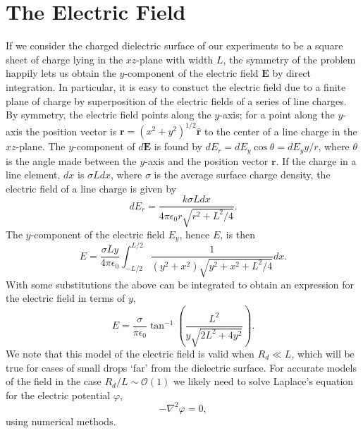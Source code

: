 \documentclass[12pt,a4paper,oneside]{book}
\begin{document}
\section{The Electric Field}
If we consider the charged dielectric surface of our experiments to be a square sheet of charge lying in the $xz$-plane with width $L$, the symmetry of the problem happily lets us obtain the $y$-component of the electric field $\mathbf{E}$ by direct integration. In particular, it is easy to constuct the electric field due to a finite plane of charge by superposition of the electric fields of a series of line charges. By symmetry, the electric field points along the $y$-axis; for a point along the $y$-axis the position vector is $\mathbf{r} = \left( x^2 + y^2 \right)^{1/2} \hat{\mathbf{r}}$ to the center of a line charge in the $xz$-plane. The $y$-component of $d\mathbf{E}$ is found by $d E_r = d E_y \cos \theta = d E_y y/ r$, where $\theta$ is the angle made between the $y$-axis and the position vector $\mathbf{r}$. If the charge in a line element, $dx$ is $\sigma L dx$, where $\sigma$ is the average surface charge density, the electric field of a line charge is given by\cite{david_j._griffiths_introduction_1999}
\[d E_r = \frac{k \sigma L dx}{4 \pi \epsilon_0 r \sqrt{r^2 + L^2/4}}.
\]
The $y$-component of the electric field $E_y$, hence $E$, is then
\[ E = \frac{\sigma L y }{4 \pi \epsilon_0} \int^{L/2}_{-L/2} \frac{1}{(y^2 + x^2) \sqrt{y^2 + x^2 + L^2/4}} dx 
.\]
With some substitutions the above can be integrated to obtain an expression for the electric field in terms of $y$, 
\begin{equation}
\label{e_field}
E = \frac{\sigma}{ \pi \epsilon_0} \tan^{-1} \left( \frac{L^2}{y \sqrt{2L^2 + 4y^2}}\right)
.\end{equation}
We note that this model of the electric field is valid when $R_d \ll L$, which will be true for cases of small drops `far' from the dielectric surface. For accurate models of the field in the case $R_d/L \sim \mathcal{O}(1)$ we likely need to solve Laplace's equation for the electric potential $\varphi$,
\[ - \nabla^2 \varphi = 0,\]
using numerical methods.
\end{document}
